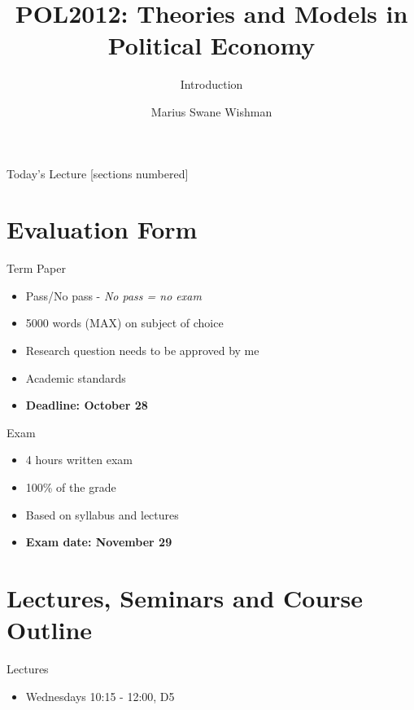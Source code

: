 \documentclass[10pt, show notes]{beamer}
\title{POL2012: Theories and Models in Political Economy}
\subtitle{Introduction}
\date{}
\author{Marius Swane Wishman}
\institute{Department of Sociology and Political Science}
\begin{document}
\maketitle

\begin{frame}{Today's Lecture}
  [sections numbered]
  \tableofcontents[hideallsubsections]
 \end{frame}

\section{Evaluation Form}

\begin{frame}{Term Paper}
\begin{itemize}[<+- | alert@+>]
	\item Pass/No pass - \textit{No pass = no exam}
	\item 5000 words (MAX) on subject of choice
	\item Research question needs to be approved by me
	\item Academic standards 
	\item \textbf{{Deadline: October 28}}
\end{itemize}
\end{frame}

\begin{frame}{Exam}
\begin{itemize}[<+- | alert@+>]
	\item 4 hours written exam
	\item 100\% of the grade
	\item Based on syllabus and lectures
	\item \textbf{{Exam date: November 29}}
\end{itemize}
\end{frame}

\section{Lectures, Seminars and Course Outline}

\begin{frame}{Lectures}
\begin{itemize}[<+- | alert@+>]
	\item Wednesdays 10:15 - 12:00, D5
\end{itemize}
\end{frame}
\end{document}
